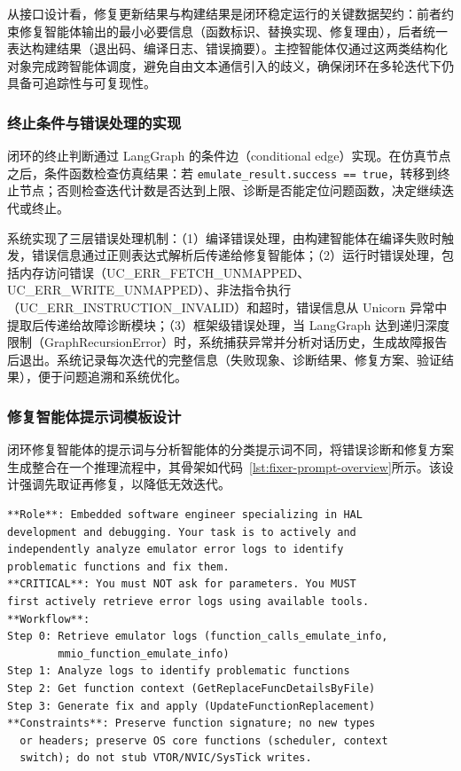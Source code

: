 从接口设计看，修复更新结果与构建结果是闭环稳定运行的关键数据契约：前者约束修复智能体输出的最小必要信息（函数标识、替换实现、修复理由），后者统一表达构建结果（退出码、编译日志、错误摘要）。主控智能体仅通过这两类结构化对象完成跨智能体调度，避免自由文本通信引入的歧义，确保闭环在多轮迭代下仍具备可追踪性与可复现性。

\subsubsection{终止条件与错误处理的实现}

闭环的终止判断通过 LangGraph 的条件边（conditional edge）实现。在仿真节点之后，条件函数检查仿真结果：若 \texttt{emulate\_result.success == true}，转移到终止节点；否则检查迭代计数是否达到上限、诊断是否能定位问题函数，决定继续迭代或终止。

系统实现了三层错误处理机制：（1）编译错误处理，由构建智能体在编译失败时触发，错误信息通过正则表达式解析后传递给修复智能体；（2）运行时错误处理，包括内存访问错误（UC\_ERR\_FETCH\_UNMAPPED、UC\_ERR\_WRITE\_UNMAPPED）、非法指令执行（UC\_ERR\_INSTRUCTION\_INVALID）和超时，错误信息从 Unicorn 异常中提取后传递给故障诊断模块；（3）框架级错误处理，当 LangGraph 达到递归深度限制（GraphRecursionError）时，系统捕获异常并分析对话历史，生成故障报告后退出。系统记录每次迭代的完整信息（失败现象、诊断结果、修复方案、验证结果），便于问题追溯和系统优化。

\subsubsection{修复智能体提示词模板设计}

闭环修复智能体的提示词与分析智能体的分类提示词不同，将错误诊断和修复方案生成整合在一个推理流程中，其骨架如代码~\ref{lst:fixer-prompt-overview}所示。该设计强调先取证再修复，以降低无效迭代。

{\renewcommand{\lstlistingname}{代码清单}\begin{lstlisting}[style=PromptStyle,caption={修复提示词模板骨架},label=lst:fixer-prompt-overview]
**Role**: Embedded software engineer specializing in HAL
development and debugging. Your task is to actively and
independently analyze emulator error logs to identify
problematic functions and fix them.
**CRITICAL**: You must NOT ask for parameters. You MUST
first actively retrieve error logs using available tools.
**Workflow**:
Step 0: Retrieve emulator logs (function_calls_emulate_info,
        mmio_function_emulate_info)
Step 1: Analyze logs to identify problematic functions
Step 2: Get function context (GetReplaceFuncDetailsByFile)
Step 3: Generate fix and apply (UpdateFunctionReplacement)
**Constraints**: Preserve function signature; no new types
  or headers; preserve OS core functions (scheduler, context
  switch); do not stub VTOR/NVIC/SysTick writes.
\end{lstlisting}}

